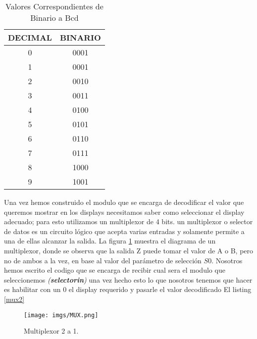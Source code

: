 \documentclass[paper=a4, fontsize=12pt]{article}        %
\numberwithin{equation}{section}                        %
\numberwithin{table}{section}                           %
\numberwithin{equation}{section}						%
\numberwithin{table}{section} 							%
\begin{document}
\begin{table}[H]
\centering
\begin{tabular}{|c|c|}
\hline
\textbf{DECIMAL} & \textbf{BINARIO} \\ \hline
0                & 0001             \\ \hline
1                & 0001             \\ \hline
2                & 0010             \\ \hline
3                & 0011             \\ \hline
4                & 0100             \\ \hline
5                & 0101             \\ \hline
6                & 0110             \\ \hline
7                & 0111             \\ \hline
8                & 1000             \\ \hline
9                & 1001             \\ \hline
\end{tabular}
\caption{Valores Correspondientes de Binario a Bcd}
\label{my-label}
\end{table}
Una vez hemos construido el modulo que se encarga de decodificar el valor  que queremos mostrar en los displays necesitamos saber como seleccionar el display adecuado; para esto utilizamos un multiplexor de 4 bits. un multiplexor o selector de datos es un circuito lógico que acepta varias entradas y solamente permite a una de ellas alcanzar la salida. La figura \ref{fig:mux} muestra el diagrama de un multiplexor, donde se observa que la salida Z puede tomar el valor de A o B, pero no de ambos a la vez, en base al valor del parámetro de selección $S0$. Nosotros hemos escrito el codigo que se encarga de recibir cual sera el modulo que seleccionemos \textit{(\textbf{selectorin})} una vez hecho esto lo que nosotros tenemos que hacer es habilitar con un 0 el display requerido y pasarle el valor decodificado El listing \ref{mux2}
\begin{figure}[H]
  \centering
     \texttt{[image: imgs/MUX.png]}
  \caption{Multiplexor 2 a 1.}
    \label{fig:mux}
\end{figure}
\end{document}
